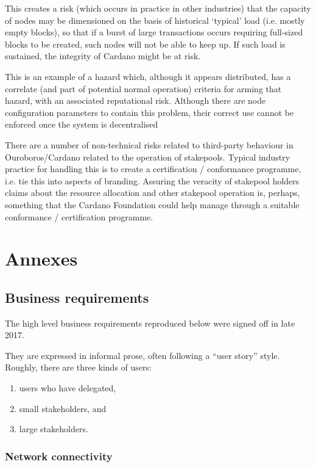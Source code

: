 \documentclass[11pt,a4paper]{article}
\begin{document}
This creates a risk (which occurs in practice in other industries) that
the capacity of nodes may be dimensioned on the basis of historical
`typical' load (i.e. mostly empty blocks), so that if a burst of large
transactions occurs requiring full-sized blocks to be created, such
nodes will not be able to keep up. If such load is sustained, the
integrity of Cardano might be at risk.

This is an example of a hazard which, although it appears distributed,
has a correlate (and part of potential normal operation) criteria for
arming that hazard, with an associated reputational risk. Although there
are node configuration parameters to contain this problem, their correct
use cannot be enforced once the system is decentralised

There are a number of non-technical risks related to third-party
behaviour in Ouroboros/Cardano related to the operation of stakepools.
Typical industry practice for handling this is to create a certification
/ conformance programme, i.e. tie this into aspects of branding.
Assuring the veracity of stakepool holders claims about the resource
allocation and other stakepool operation is, perhaps, something that the
Cardano Foundation could help manage through a suitable conformance /
certification programme.

\section{Annexes}
\label{annexes}

\subsection{Business requirements}
\label{business-requirements}

The high level business requirements reproduced below were signed
off in late 2017.

They are expressed in informal prose, often following a ``user story''
style. Roughly, there are three kinds of users:

\begin{enumerate}
\item
  users who have delegated,
\item
  small stakeholders, and
\item
  large stakeholders.
\end{enumerate}

\subsubsection{Network connectivity}
\label{network-connectivity}
\end{document}
